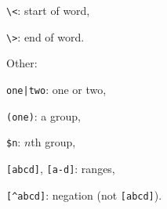 \begin{compactenum}
\begin{compactenum}
\item \texttt{\textbackslash{}<}: start of word, 
\item \texttt{\textbackslash{}>}: end of word.
\end{compactenum}
\item Other:
\begin{compactenum}
\item \texttt{one|two}: one or two,
\item \texttt{(one)}: a group,
\item \texttt{\$n}: $n$th group,
\item \texttt{[abcd]}, \texttt{[a-d]}: ranges,
\item \texttt{[\textasciicircum{}abcd]}: negation (not \texttt{[abcd]}).
\end{compactenum}
\end{compactenum}
